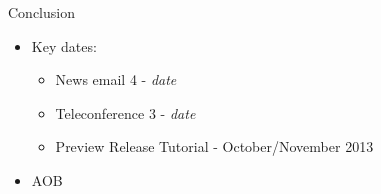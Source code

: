 \documentclass{beamer}
\begin{document}
\begin{frame}{Conclusion}

  \begin{itemize}

  \item Key dates: 
    \begin{itemize}
    \item News email 4 - \emph{date}
    \item Teleconference 3 - \emph{date}
    \item Preview Release Tutorial - October/November 2013
    \end{itemize}

  \item AOB

  \end{itemize}

\end{frame}
\end{document}
